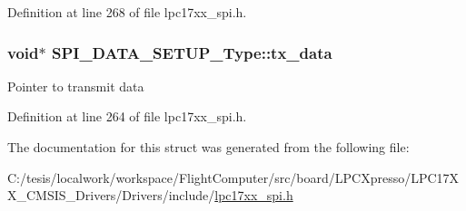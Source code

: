 \-Definition at line 268 of file lpc17xx\-\_\-spi.\-h.

\hypertarget{struct_s_p_i___d_a_t_a___s_e_t_u_p___type_a362d9e832e898541094e3b283d8bdb07}{
\subsubsection[{tx\-\_\-data}]{\setlength{\rightskip}{0pt plus 5cm}void$\ast$ {\bf \-S\-P\-I\-\_\-\-D\-A\-T\-A\-\_\-\-S\-E\-T\-U\-P\-\_\-\-Type\-::tx\-\_\-data}}}\label{struct_s_p_i___d_a_t_a___s_e_t_u_p___type_a362d9e832e898541094e3b283d8bdb07}
\-Pointer to transmit data 

\-Definition at line 264 of file lpc17xx\-\_\-spi.\-h.



\-The documentation for this struct was generated from the following file\-:\begin{DoxyCompactItemize}
\item 
\-C\-:/tesis/localwork/workspace/\-Flight\-Computer/src/board/\-L\-P\-C\-Xpresso/\-L\-P\-C17\-X\-X\-\_\-\-C\-M\-S\-I\-S\-\_\-\-Drivers/\-Drivers/include/\hyperlink{lpc17xx__spi_8h}{lpc17xx\-\_\-spi.\-h}\end{DoxyCompactItemize}
